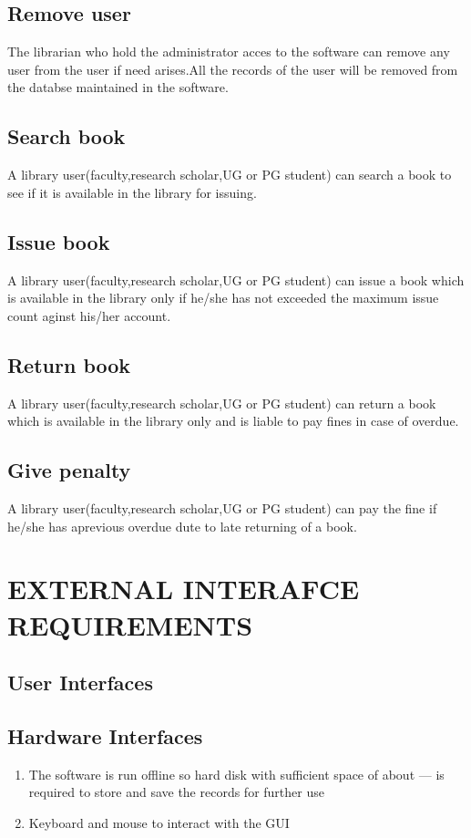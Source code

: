 \documentclass{article}
\begin{document}
\subsection{Remove user}
The librarian who hold the administrator acces to the software can remove any user from the user if need arises.All the records of the user will be removed from the databse maintained in the software.
\subsection{Search book}
A library user(faculty,research scholar,UG or PG student) can search a book to see if it is available in the library for issuing.

\subsection{Issue book}
A library user(faculty,research scholar,UG or PG student) can issue a book which is available in the library only if he/she has not exceeded the maximum issue count aginst his/her account.
\subsection{Return book}
A library user(faculty,research scholar,UG or PG student) can return a book which is available in the library only and is liable to pay fines in case of overdue.

\subsection{Give penalty}
A library user(faculty,research scholar,UG or PG student) can pay the fine if he/she has aprevious overdue dute to late returning of a book.


\section{EXTERNAL INTERAFCE REQUIREMENTS}
\subsection{User Interfaces}
\subsection{Hardware Interfaces}
\begin{enumerate}
\item The software is run offline so hard disk with sufficient space of about --- is required to store and save the records for further use
\item Keyboard and mouse to interact with the GUI
\end{enumerate}
\end{document}

